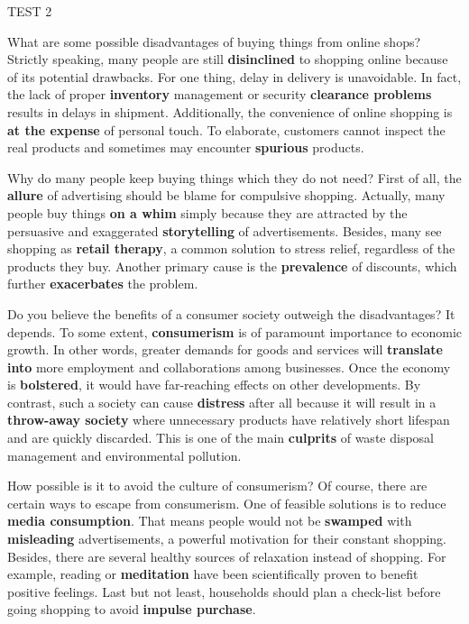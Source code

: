 \begin{glossarymc}[Cambridge 15]
\begin{test}{TEST 2}
    \begin{qa}{What are some possible disadvantages of buying things from online shops?}
    Strictly speaking, many people are still \textbf{disinclined} to shopping online because of its potential drawbacks. For one thing, delay in delivery is unavoidable. In fact, the lack of proper \textbf{inventory} management or security \textbf{clearance problems} results in delays in shipment. Additionally, the convenience of online shopping is \textbf{at the expense} of personal touch. To elaborate, customers cannot inspect the real products and sometimes may encounter \textbf{spurious} products.
    \end{qa}

    \begin{qa}{Why do many people keep buying things which they do not need?}
    First of all, the \textbf{allure} of advertising should be blame for compulsive shopping. Actually, many people buy things \textbf{on a whim} simply because they are attracted by the persuasive and exaggerated \textbf{storytelling} of advertisements. Besides, many see shopping as \textbf{retail therapy}, a common solution to stress relief, regardless of the products they buy. Another primary cause is the \textbf{prevalence} of discounts, which further \textbf{exacerbates} the problem.
    \end{qa}

    \begin{qa}{Do you believe the benefits of a consumer society outweigh the disadvantages?}
    It depends. To some extent, \textbf{consumerism} is of paramount importance to economic growth. In other words, greater demands for goods and services will \textbf{translate into} more employment and collaborations among businesses. Once the economy is \textbf{bolstered}, it would have far-reaching effects on other developments. By contrast, such a society can cause \textbf{distress} after all because it will result in a \textbf{throw-away society} where unnecessary products have relatively short lifespan and are quickly discarded. This is one of the main \textbf{culprits} of waste disposal management and environmental pollution.
    \end{qa}

    \begin{qa}{How possible is it to avoid the culture of consumerism?}
    Of course, there are certain ways to escape from consumerism. One of feasible solutions is to reduce \textbf{media consumption}. That means people would not be \textbf{swamped} with \textbf{misleading} advertisements, a powerful motivation for their constant shopping. Besides, there are several healthy sources of relaxation instead of shopping. For example, reading or \textbf{meditation} have been scientifically proven to benefit positive feelings. Last but not least, households should plan a check-list before going shopping to avoid \textbf{impulse purchase}.
    \end{qa}


\end{test}
\end{glossarymc}
